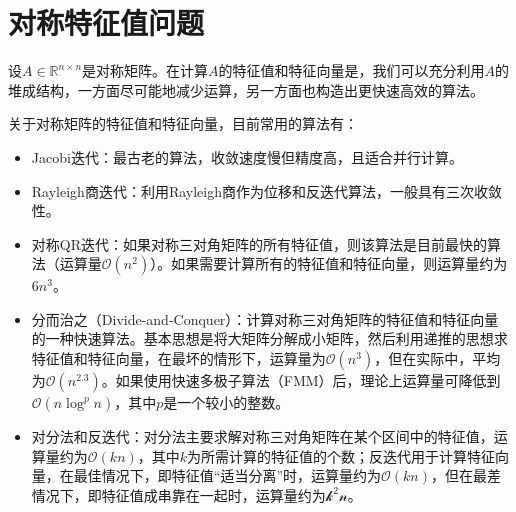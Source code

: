 \documentclass[UTF8]{article}
\begin{document}
\section{对称特征值问题}
\begin{flushleft}
设$A \in \mathbb{R}^{n \times n}$是对称矩阵。在计算$A$的特征值和特征向量是，我们可以充分利用$A$的堆成结构，一方面尽可能地减少运算，另一方面也构造出更快速高效的算法。\newline

关于对称矩阵的特征值和特征向量，目前常用的算法有：
\begin{itemize}
  \item \textcolor[rgb]{0.00,0.07,1.00}{Jacobi迭代：}最古老的算法，收敛速度慢但精度高，且适合并行计算。
  \item \textcolor[rgb]{0.00,0.07,1.00}{Rayleigh商迭代：}利用Rayleigh商作为位移和反迭代算法，一般具有三次收敛性。
  \item \textcolor[rgb]{0.00,0.07,1.00}{对称QR迭代：}如果对称三对角矩阵的所有特征值，则该算法是目前最快的算法（运算量$\mathcal{O}(n^2)$）。如果需要计算所有的特征值和特征向量，则运算量约为$6n^3$。
  \item \textcolor[rgb]{0.00,0.07,1.00}{分而治之（Divide-and-Conquer）：}计算对称三对角矩阵的特征值和特征向量的一种快速算法。基本思想是将大矩阵分解成小矩阵，然后利用递推的思想求特征值和特征向量，在最坏的情形下，运算量为$\mathcal{O}(n^3)$，但在实际中，平均为$\mathcal{O}(n^{2.3})$。如果使用快速多极子算法（FMM）后，理论上运算量可降低到$\mathcal{O}(n\log^pn)$，其中$p$是一个较小的整数。
  \item \textcolor[rgb]{0.00,0.07,1.00}{对分法和反迭代：}对分法主要求解对称三对角矩阵在某个区间中的特征值，运算量约为$\mathcal{O}(kn)$，其中$k$为所需计算的特征值的个数；反迭代用于计算特征向量，在最佳情况下，即特征值“适当分离”时，运算量约为$\mathcal{O}(kn)$，但在最差情况下，即特征值成串靠在一起时，运算量约为$\mathcal{k^2n}$。
\end{itemize}
\end{flushleft}
\end{document}
